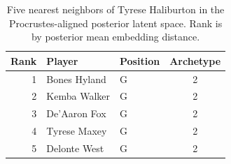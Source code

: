 \begin{table}[htbp]
  \centering\small
  \begin{tabular}{rllc}
    \toprule
    Rank & Player & Position & Archetype \\
    \midrule
    1 & Bones Hyland & G & 2 \\
    2 & Kemba Walker & G & 2 \\
    3 & De'Aaron Fox & G & 2 \\
    4 & Tyrese Maxey & G & 2 \\
    5 & Delonte West & G & 2 \\
    \bottomrule
  \end{tabular}
  \caption{Five nearest neighbors of Tyrese Haliburton in the Procrustes-aligned posterior latent space. Rank is by posterior mean embedding distance.}
  \label{tab:Tyrese_Haliburton_neighbors}
\end{table}

